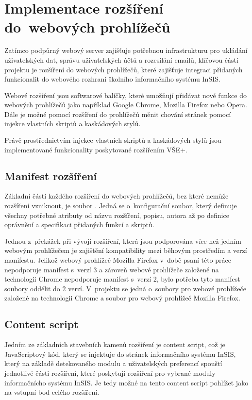 \chapter{Implementace rozšíření do~webových prohlížečů}

Zatímco podpůrný webový server zajišťuje potřebnou infrastrukturu pro ukládání uživatelských dat, správu uživatelských účtů a rozesílání emailů, klíčovou částí projektu je rozšíření do webových prohlížečů, které zajišťuje integraci přidaných funkcionalit do webového rozhraní školního informačního systému InSIS.

Webové rozšíření jsou softwarové balíčky, které umožňují přidávat nové funkce do webových prohlížečů jako například Google Chrome, Mozilla Firefox nebo Opera. Dále je možné pomocí rozšíření do prohlížečů měnit chování stránek pomocí injekce vlastních skriptů a kaskádových stylů.

Právě prostřednictvím injekce vlastních skriptů a kaskádových stylů jsou implementované funkcionality poskytované rozšířením VŠE+.

\section{Manifest rozšíření}

Základní částí každého rozšíření do webových prohlížečů, bez které nemůže rozšíření vzniknout, je soubor . Jedná se o~konfigurační soubor, který definuje všechny potřebné atributy od názvu rozšíření, popisu, autora až po definice oprávnění a specifikaci přidaných funkcí a skriptů. 

Jednou z~překážek při vývoji rozšíření, která jsou podporována více než jedním webovým prohlížečem je zajištění kompatibility mezi běhovým prostředím a verzí manifestu. Jelikož webový prohlížeč Mozilla Firefox v~době psaní této práce nepodporuje manifest s~verzí 3 a zároveň webové prohlížeče založené na technologii Chrome nepodporuje manifest s~verzí 2, bylo potřeba tyto manifest soubory oddělit do 2 verzí. V~projektu se jedná o~soubory  pro webové prohlížeče založené na technologii Chrome a soubor  pro webový prohlížeč Mozilla Firefox.

\section{Content script}

Jedním ze základních stavebních kamenů rozšíření je content script, což je JavaScriptový kód, který se injektuje do stránek informačního systému InSIS, který na základě detekovaného modulu a uživatelských preferencí spouští jednotlivé části rozšíření, které poskytují rozšíření pro vybrané moduly informačnícho systému InSIS. Je tedy možné na tento content script pohlížet jako na vstupní bod celého rozšíření.

